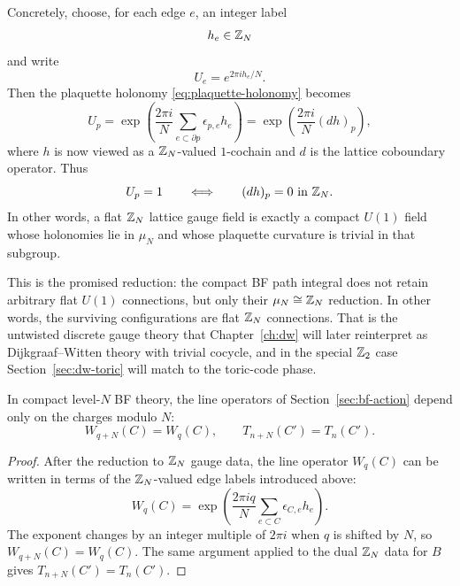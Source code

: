 \noindent Concretely, choose, for each edge $e$, an integer label
\begin{equation*}
h_e \in \mathbb{Z}_N
\end{equation*}
and write
\begin{equation}\label{eq:U-from-h}
U_e = e^{2\pi i h_e/N}.
\end{equation}
Then the plaquette holonomy \eqref{eq:plaquette-holonomy} becomes
\begin{equation}\label{eq:Up-from-h}
U_p
=
\exp\!\left(\frac{2\pi i}{N}\sum_{e\subset \partial p}\epsilon_{p,e}h_e\right)
=
\exp\!\left(\frac{2\pi i}{N}(dh)_p\right),
\end{equation}
where $h$ is now viewed as a $\mathbb{Z}_N$-valued $1$-cochain and $d$ is the lattice coboundary operator. Thus
\begin{equation}\label{eq:flatness-mod-N}
U_p = 1
\qquad\Longleftrightarrow\qquad
(dh)_p=0 \ \text{in }\mathbb{Z}_N.
\end{equation}
In other words, a flat $\mathbb{Z}_N$ lattice gauge field is exactly a compact $U(1)$ field whose holonomies lie in $\mu_N$ and whose plaquette curvature is trivial in that subgroup.

\medskip

\noindent This is the promised reduction: the compact BF path integral does not retain arbitrary flat $U(1)$ connections, but only their $\mu_N\cong \mathbb{Z}_N$ reduction. In other words, the surviving configurations are flat $\mathbb{Z}_N$ connections. That is the untwisted discrete gauge theory that Chapter~\ref{ch:dw} will later reinterpret as Dijkgraaf--Witten theory with trivial cocycle, and in the special $\mathbb{Z}_2$ case Section~\ref{sec:dw-toric} will match to the toric-code phase.

\begin{corollary}\label{cor:charges-mod-N}
In compact level-$N$ BF theory, the line operators of Section~\ref{sec:bf-action} depend only on the charges modulo $N$:
\begin{equation}\label{eq:charges-mod-N}
W_{q+N}(C)=W_q(C),
\qquad
T_{n+N}(C')=T_n(C').
\end{equation}
\end{corollary}

\begin{proof}
After the reduction to $\mathbb{Z}_N$ gauge data, the line operator $W_q(C)$ can be written in terms of the $\mathbb{Z}_N$-valued edge labels introduced above:
\begin{equation*}
\!\!\!
W_q(C)
=
\exp\!\left(\frac{2\pi i q}{N}\sum_{e\subset C}\epsilon_{C,e}h_e\right).
\end{equation*}
The exponent changes by an integer multiple of $2\pi i$ when $q$ is shifted by $N$, so $W_{q+N}(C)=W_q(C)$. The same argument applied to the dual $\mathbb{Z}_N$ data for $B$ gives $T_{n+N}(C')=T_n(C')$.
\end{proof}

